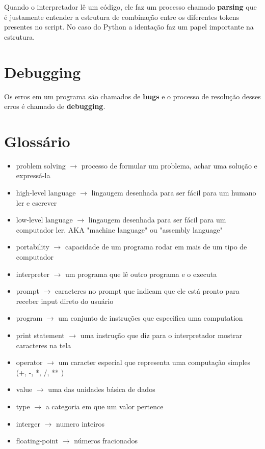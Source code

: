 \documentclass[a4paper,11pt]{book}
\begin{document}
Quando o interpretador lê um código, ele faz um processo chamado \textbf{parsing} que é justamente entender a estrutura de combinação entre os diferentes tokens presentes no script. No caso do Python a identação faz um papel importante na estrutura.

\section{Debugging}

Os erros em um programa são chamados de \textbf{bugs} e o processo de resolução desses erros é chamado de \textbf{debugging}.

\section{Glossário}
\begin{itemize}
	\item problem solving $\rightarrow$ processo de formular um problema, achar uma solução e expressá-la
	\item high-level language $\rightarrow$ lingaugem desenhada para ser fácil para um humano ler e escrever
	\item low-level language $\rightarrow$ lingaugem desenhada para ser fácil para um computador ler. AKA "machine language" ou "assembly language"
	\item portability $\rightarrow$ capacidade de um programa rodar em mais de um tipo de computador
	\item interpreter $\rightarrow$ um programa que lê outro programa e o executa
	\item prompt $\rightarrow$ caracteres no prompt que indicam que ele está pronto para receber input direto do usuário
	\item program $\rightarrow$ um conjunto de instruções que especifica uma computation
	\item print statement $\rightarrow$ uma instrução que diz para o interpretador mostrar caracteres na tela
	\item operator $\rightarrow$ um caracter especial que representa uma computação simples (+, -, *, /, ** ) 
	\item value $\rightarrow$ uma das unidades básica de dados
	\item type $\rightarrow$ a categoria em que um valor pertence
	\item interger $\rightarrow$ numero inteiros
	\item floating-point $\rightarrow$ números fracionados

\end{itemize}
\end{document}
